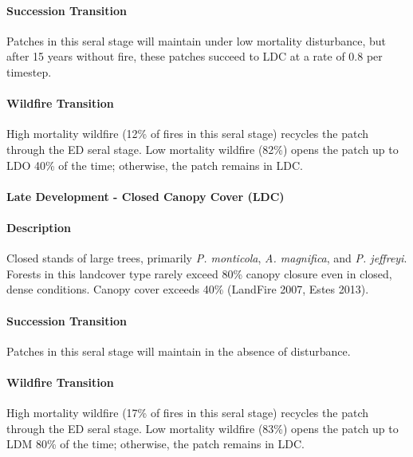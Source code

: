 \paragraph{Succession Transition} Patches in this seral stage will maintain under low mortality disturbance, but after 15 years without fire, these patches succeed to LDC at a rate of 0.8 per timestep.

\paragraph{Wildfire Transition} High mortality wildfire (12\% of fires in this seral stage) recycles the patch through the ED seral stage. Low mortality wildfire (82\%) opens the patch up to LDO 40\% of the time; otherwise, the patch remains in LDC.

\noindent\hrulefill

\paragraph{Late Development - Closed Canopy Cover (LDC)}

\paragraph{Description} Closed stands of large trees, primarily \emph{P. monticola}, \emph{A. magnifica}, and \emph{P. jeffreyi}. Forests in this landcover type rarely exceed 80\% canopy closure even in closed, dense conditions. Canopy cover exceeds 40\% (LandFire 2007, Estes 2013).

\paragraph{Succession Transition} Patches in this seral stage will maintain in the absence of disturbance.

\paragraph{Wildfire Transition} High mortality wildfire (17\% of fires in this seral stage) recycles the patch through the ED seral stage. Low mortality wildfire (83\%) opens the patch up to LDM 80\% of the time; otherwise, the patch remains in LDC.

\noindent\hrulefill




